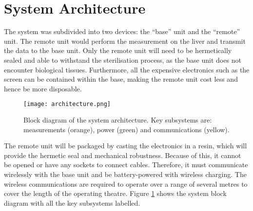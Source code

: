 \section{System Architecture}

The system was subdivided into two devices: the ``base'' unit and the ``remote'' unit. The remote unit would perform the measurement on the liver and transmit the data to the base unit. Only the remote unit will need to be hermetically sealed and able to withstand the sterilisation process, as the base unit does not encounter biological tissues. Furthermore, all the expensive electronics such as the screen can be contained within the base, making the remote unit cost less and hence be more disposable.\\

\begin{figure}[htb]
	\centering
	\texttt{[image: architecture.png]}
	\caption{Block diagram of the system architecture. Key subsystems are: measurements (orange), power (green) and communications (yellow).}
	\label{fig: architecture}
\end{figure}

The remote unit will be packaged by casting the electronics in a resin, which will provide the hermetic seal and mechanical robustness. Because of this, it cannot be opened or have any sockets to connect cables. Therefore, it must communicate wirelessly with the base unit and be battery-powered with wireless charging. The wireless communications are required to operate over a range of several metres to cover the length of the operating theatre. Figure \ref{fig: architecture} shows the system block diagram with all the key subsystems labelled.